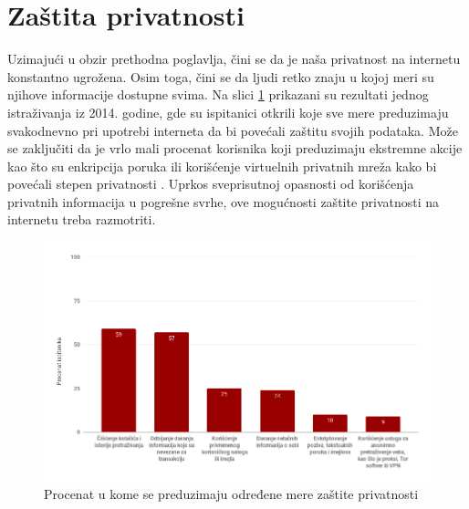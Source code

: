 \documentclass[a4paper]{article}
\begin{document}
\section{Zaštita privatnosti}
\label{sec:zastita}
Uzimajući u obzir prethodna poglavlja, čini se da je naša privatnost na internetu konstantno ugrožena. Osim toga, čini se da ljudi retko znaju u kojoj meri su njihove informacije dostupne svima.  Na slici \ref{fig:slika1} prikazani su rezultati jednog istraživanja iz 2014. godine, gde su ispitanici otkrili koje sve mere preduzimaju svakodnevno pri upotrebi interneta da bi povećali zaštitu svojih podataka. Može se zaključiti da je vrlo mali procenat korisnika koji preduzimaju ekstremne akcije kao što su enkripcija poruka ili korišćenje virtuelnih privatnih mreža kako bi povećali stepen privatnosti \cite{stat}. Uprkos sveprisutnoj opasnosti od korišćenja privatnih informacija u pogrešne svrhe, ove mogućnosti zaštite privatnosti na internetu treba razmotriti.


\begin{figure}[h!]
	\begin{center}
		\includegraphics[scale=0.35]{chart.png}
	\end{center}
	\caption{Procenat u kome se preduzimaju određene mere zaštite privatnosti}
	\label{fig:slika1}
\end{figure}
\end{document}
